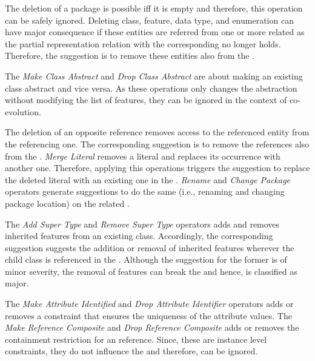 The deletion of a package is possible iff it is empty and therefore, this operation can be safely ignored. Deleting class, feature, data type, and enumeration can have major consequence if these entities are referred from one or more related \viewtypes as the partial representation relation with the corresponding \metamodel no longer holds. Therefore, the suggestion is to remove these entities also from the \viewtypes.

The \textit{Make Class Abstract} and \textit{Drop Class Abstract} are about making an existing class abstract and vice versa. As these operations only changes the abstraction without modifying the list of features, they can be ignored in the context of \viewtype co-evolution. 

The deletion of an opposite reference removes access to the referenced entity from the referencing one. The corresponding suggestion is to remove the references also from the \viewtype. \textit{Merge Literal} removes a literal and replaces its occurrence with another one. Therefore, applying this operations triggers the suggestion to replace the deleted literal with an existing one in the \viewtype. \textit{Rename} and \textit{Change Package} operators generate suggestions to do the same (i.e., renaming and changing package location) on the related \viewtypes.

The \textit{Add Super Type} and \textit{Remove Super Type} operators adds and removes inherited features from an existing class. Accordingly, the corresponding suggestion suggests the addition or removal of inherited features wherever the child class is referenced in the \viewtype. Although the suggestion for the former is of minor severity, the removal of features can break the \viewtype and hence, is classified as major.

The \textit{Make Attribute Identified} and \textit{Drop Attribute Identifier} operators adds or removes a constraint that ensures the uniqueness of the attribute values. The \textit{Make Reference Composite} and \textit{Drop Reference Composite} adds or removes the containment restriction for an reference. Since, these are instance level constraints, they do not influence the \viewtype and therefore, can be ignored.

 

